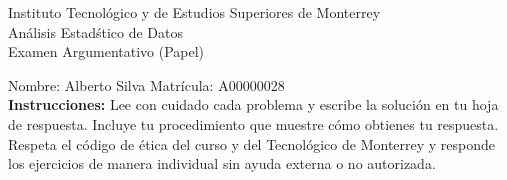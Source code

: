 \documentclass[10pt]{report}
\begin{document}
\newpage



\begin{center}
{\large Instituto Tecnol\'{o}gico y de Estudios Superiores de Monterrey \\
An\'alisis Estad\'stico de Datos } \\
Examen Argumentativo (Papel)
\end{center}

Nombre: \underline{\hspace*{.2in}}
Alberto Silva
\underline{\hspace*{.2in}} \quad Matr\'icula:\underline{\hspace*{.2in}}
A00000028
\underline{\hspace*{.2in}} \\

{\bf Instrucciones:} Lee con cuidado cada problema y escribe la soluci\'on
en tu hoja de respuesta. Incluye tu procedimiento que muestre c\'omo obtienes tu respuesta.  Respeta el c\'odigo de \'etica del curso y del Tecnol\'ogico de Monterrey y responde los ejercicios de manera individual sin ayuda externa o no autorizada.
\end{document}

